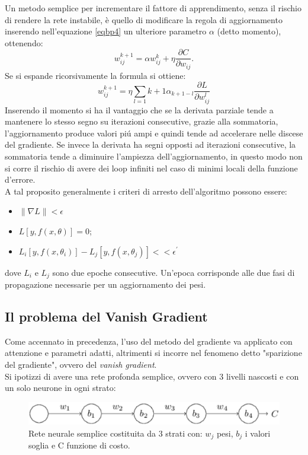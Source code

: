 \documentclass[a4paper,12pt]{report}
\begin{document}
Un metodo semplice per incrementare il fattore di apprendimento, senza il rischio di rendere la rete instabile, \`{e} quello di modificare la regola di aggiornamento inserendo nell'equazione \ref{eqbp4} un ulteriore parametro $\alpha$ (detto momento), ottenendo:
\begin{equation}
w_{ij}^{k+1}=\alpha w_{ij}^k + \eta \frac{\partial C}{\partial w_{ij}}.
\end{equation}
Se si espande ricorsivamente la formula si ottiene:
\begin{equation}
w_{ij}^{k+1}=\eta \sum_{l=1}{k+1}\alpha_{k+1-l}\frac{\partial L}{\partial w_{ij}^l}
\end{equation}
Inserendo il momento si ha il vantaggio che se la derivata parziale tende a mantenere lo stesso segno su iterazioni consecutive, grazie alla sommatoria, l'aggiornamento produce valori pi\'{u} ampi e quindi tende ad accelerare nelle discese del gradiente. Se invece la derivata ha segni opposti ad iterazioni consecutive, la sommatoria tende a diminuire l'ampiezza dell'aggiornamento, in questo modo non si corre il rischio di avere dei loop infiniti nel caso di minimi locali della funzione d'errore.\\
A tal proposito generalmente i criteri di arresto dell'algoritmo possono essere:
\begin{itemize}
\item $\lVert \nabla L\rVert < \epsilon$
\item $L[y,f(x,\theta)]=0$;
\item $L_i[y,f(x,\theta_i)]-L_j[y,f(x,\theta_j)]<<\epsilon^{\prime}$
\end{itemize}
dove $L_i$ e $L_j$ sono due epoche consecutive. Un'epoca corrisponde alle due fasi di propagazione necessarie per un aggiornamento dei pesi.
\subsection*{Il problema del Vanish Gradient}
Come accennato in precedenza, l'uso del metodo del gradiente va applicato con attenzione e parametri adatti, altrimenti si incorre nel fenomeno detto "sparizione del gradiente", ovvero del \textit{vanish gradient}.\\
Si ipotizzi di avere una rete profonda semplice, ovvero con 3 livelli nascosti e con un solo neurone in ogni strato:
\newpage
\begin{figure}[!t]
\centering
\includegraphics[scale=0.5]{vanish}
\caption{Rete neurale semplice costituita da 3 strati con: $w_j$ pesi, $b_j$ i valori soglia e C funzione di costo.}
\label{fig:vanish}
\end{figure}
\end{document}
